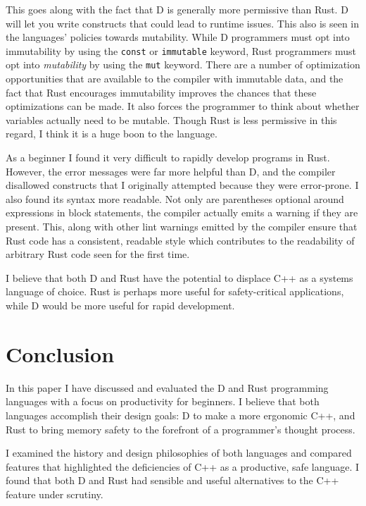 \documentclass[finalcopy]{srpaper}
\begin{document}
This goes along with the fact that D is generally more permissive than Rust. D
will let you write constructs that could lead to runtime issues. This also is
seen in the languages' policies towards mutability. While D programmers must
opt into immutability by using the \texttt{const} or \texttt{immutable}
keyword, Rust programmers must opt into \textit{mutability} by using the
\texttt{mut} keyword. There are a number of optimization opportunities that
are available to the compiler with immutable data, and the fact that Rust
encourages immutability improves the chances that these optimizations can be
made. It also forces the programmer to think about whether variables actually
need to be mutable. Though Rust is less permissive in this regard, I think it
is a huge boon to the language.

As a beginner I found it very difficult to rapidly develop programs in Rust.
However, the error messages were far more helpful than D, and the compiler
disallowed constructs that I originally attempted because they were
error-prone. I also found its syntax more readable. Not only are parentheses
optional around expressions in block statements, the compiler actually emits a
warning if they are present. This, along with other lint warnings emitted by
the compiler ensure that Rust code has a consistent, readable style which
contributes to the readability of arbitrary Rust code seen for the first time.

I believe that both D and Rust have the potential to displace C++ as a systems
language of choice. Rust is perhaps more useful for safety-critical
applications, while D would be more useful for rapid development.

\chapter{Conclusion}

In this paper I have discussed and evaluated the D and Rust programming
languages with a focus on productivity for beginners. I believe that both
languages accomplish their design goals: D to make a more ergonomic C++, and
Rust to bring memory safety to the forefront of a programmer's thought process.

I examined the history and design philosophies of both languages and compared
features that highlighted the deficiencies of C++ as a productive, safe
language. I found that both D and Rust had sensible and useful alternatives to
the C++ feature under scrutiny.
\end{document}
